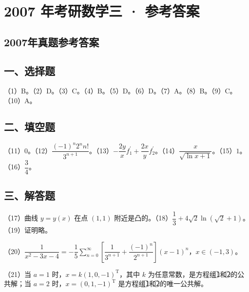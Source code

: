 \documentclass[UTF8,12pt]{ctexart}
\begin{document}
\section*{2007 年考研数学三 · 参考答案}
\subsection*{2007年真题参考答案}

\subsection*{一、选择题}

（1）B。（2）D。（3）C。（4）B。（5）D。（6）D。（7）A。（8）B。（9）C。（10）A。


\subsection*{二、填空题}

（11）\(\displaystyle 0\)。（12）\(\displaystyle \dfrac{\displaystyle (-1)^n2^nn!}{\displaystyle 3^{n+1}}\)。（13）\(\displaystyle -\dfrac{\displaystyle 2y}{\displaystyle x}f_1^{\prime}+\dfrac{\displaystyle 2x}{\displaystyle y}f_2^{\prime}\)。（14）\(\displaystyle \dfrac{\displaystyle x}{\displaystyle \sqrt{\ln x+1}}\)。（15）\(\displaystyle 1\)。（16）\(\displaystyle \dfrac{\displaystyle 3}{\displaystyle 4}\)。


\subsection*{三、解答题}

（17）曲线 \(\displaystyle y=y(x)\) 在点 \(\displaystyle (1,\allowbreak 1)\) 附近是凸的。（18）\(\displaystyle \dfrac{\displaystyle 1}{\displaystyle 3}+4\sqrt2\ln(\sqrt2+1)\)。（19）证明略。


（20）\(\displaystyle \dfrac{\displaystyle 1}{\displaystyle x^2-3x-4}=-\dfrac{\displaystyle 1}{\displaystyle 5}\displaystyle \sum_{n=0}^{\infty}\left[\dfrac{\displaystyle 1}{\displaystyle 3^{n+1}}+\dfrac{\displaystyle (-1)^n}{\displaystyle 2^{n+1}}\right](x-1)^n\)，\(\displaystyle x\in(-1,\allowbreak 3)\)。


（21）当 \(\displaystyle a=1\) 时，\(\displaystyle x=k(1,\allowbreak 0,\allowbreak -1)^{\mathrm T}\)，其中 \(\displaystyle k\) 为任意常数，是方程组\textcircled{1}和\textcircled{2}的公共解；当 \(\displaystyle a=2\) 时，\(\displaystyle x=(0,\allowbreak 1,\allowbreak -1)^{\mathrm T}\) 是方程组\textcircled{1}和\textcircled{2}的唯一公共解。
\end{document}
